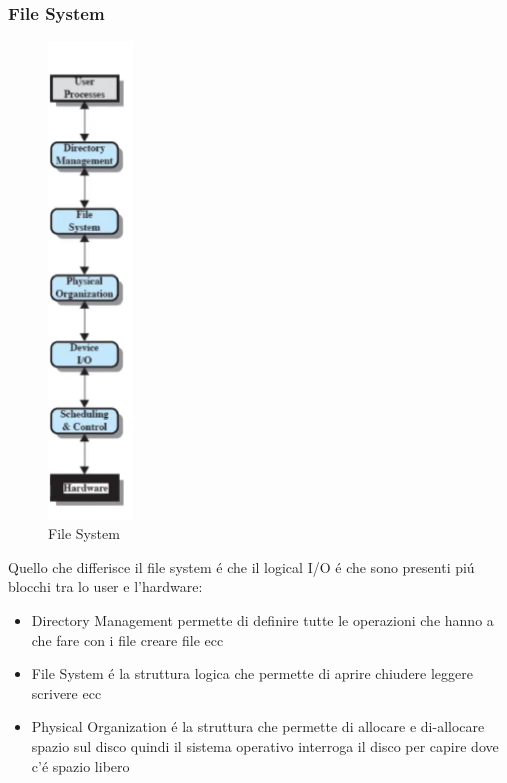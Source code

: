 \subsubsection*{File System}
\begin{figure}[H]
    \centering
    \includegraphics[width=0.2\textwidth]{immagini/FileSystemIO}
    \caption{File System}
\end{figure}
Quello che differisce il file system é che il logical I/O é che sono presenti piú blocchi tra lo user e l'hardware:
\begin{itemize}
    \item Directory Management permette di definire tutte le operazioni che hanno a che fare con i file creare file ecc
    \item File System é la struttura logica che permette di aprire chiudere leggere scrivere ecc
    \item Physical Organization é la struttura che permette di allocare e di-allocare spazio sul disco quindi il sistema operativo interroga il disco per capire dove c'é spazio libero
\end{itemize}
